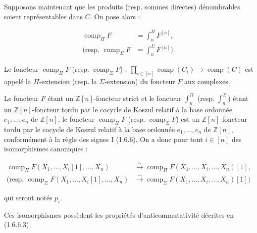%
Supposons maintenant que les produits (resp. sommes directes) dénombrables
soient représentables dans $C$. On pose alors :

\begin{equation}
  \begin{aligned}
    \operatorname{comp}_{\Pi}F
      &=\int_n^{\Pi}F^{[n]},\\
    \text{(resp. }\operatorname{comp}_{\Sigma}F
      &=\int_n^{\Sigma}F^{[n]}\text{)}.
  \end{aligned}
  \tag{2.4.2.6}
\end{equation}

Le foncteur
$\operatorname{comp}_{\Pi}F$ (resp. $\operatorname{comp}_{\Sigma}F$) :
$\prod_{i\in[n]}\operatorname{comp}(C_i)\longrightarrow
\operatorname{comp}(C)$ est appelé la $\Pi$-extension (resp. la
$\Sigma$-extension) du foncteur $F$ aux complexes.

Le foncteur $F$ étant un $\mathbb Z[n]$-foncteur strict et le foncteur
$\int_n^{\Pi}$ (resp. $\int_n^{\Sigma}$) étant un $\mathbb Z[n]$-foncteur
tordu par le cocycle de Koszul relatif à la base ordonnée
$e_1,\ldots,e_n$ de $\mathbb Z[n]$, le foncteur
$\operatorname{comp}_{\Pi}F$ (resp. $\operatorname{comp}_{\Sigma}F$) est
un $\mathbb Z[n]$-foncteur tordu par le cocycle de Koszul relatif à la base
ordonnée $e_1,\ldots,e_n$ de $\mathbb Z[n]$, conformément à la règle des
signes I (1.6.6). On a donc pour tout $i\in[n]$ des isomorphismes
canoniques :

\begin{equation}
  \begin{aligned}
    \operatorname{comp}_{\Pi}F(X_1,\ldots,X_i[1],\ldots,X_n)
      &\xrightarrow{\sim}
      \operatorname{comp}_{\Pi}F(X_1,\ldots,X_i,\ldots,X_n)[1],\\
    \text{(resp. }\operatorname{comp}_{\Sigma}F(X_1,\ldots,X_i[1],\ldots,X_n)
      &\xrightarrow{\sim}
      \operatorname{comp}_{\Sigma}F(X_1,\ldots,X_i,\ldots,X_n)[1]\text{)}
  \end{aligned}
  \tag{2.4.2.7}
\end{equation}

qui seront notés $p_i$.

Ces isomorphismes possèdent les propriétés d'anticommutativité décrites en
(1.6.6.3).

